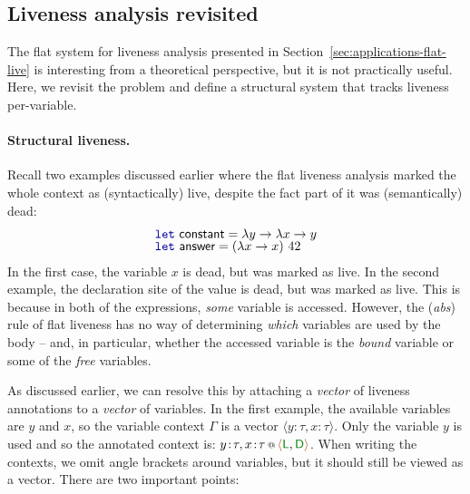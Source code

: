 
\subsection{Liveness analysis revisited}
\label{sec:applications-struct-live}

The flat system for liveness analysis presented in Section~\ref{sec:applications-flat-live} is 
interesting from a theoretical perspective, but it is not practically useful. Here, we
revisit the problem and define a structural system that tracks liveness per-variable.

\paragraph{Structural liveness.} 
Recall two examples discussed earlier where the flat liveness analysis marked the whole context
as (syntactically) live, despite the fact part of it was (semantically) dead:
%
\begin{equation*}
\begin{array}{l}
\kvd{let}~\ident{constant} = \lambda y \rightarrow \lambda x \rightarrow y\\[-0.25em]
\kvd{let}~\ident{answer} = (\lambda x \rightarrow x)~42
\end{array}
\end{equation*}
%
In the first case, the variable $x$ is dead, but was marked as live. In the second example, the
declaration site of the  value is dead, but was marked as live. This is because in 
both of the expressions, \emph{some} variable is accessed. However, the (\emph{abs}) rule of flat
liveness has no way of determining \emph{which} variables are used by the body -- and, in particular,
whether the accessed variable is the \emph{bound} variable or some of the \emph{free} variables.

As discussed earlier, we can resolve this by attaching a \emph{vector} of liveness annotations to
a \emph{vector} of variables. In the first example, the available variables are $y$ and $x$, so
the variable context $\Gamma$ is a vector $\langle y\!:\!\tau, x\!:\!\tau \rangle$. Only the variable $y$
is used and so the annotated context is: $\coctx{y\!:\!\tau, x\!:\!\tau}{ \alift{\cclrd{\ident{L}}, \cclrd{\ident{D}}} }$.
When writing the contexts, we omit angle brackets around variables, but it should still be viewed
as a vector. There are two important points:

